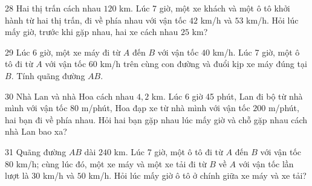 \gap
\begin{probbox}{28}{\relax}
Hai thị trấn cách nhau $120$ km. Lúc 7 giờ, một xe khách và một ô tô khởi hành từ hai thị trấn, đi về phía nhau với vận tốc $42$ km/h và $53$ km/h. Hỏi lúc mấy giờ, trước khi gặp nhau, hai xe cách nhau $25$ km?
\end{probbox}
\gap
\begin{probbox}{29}{\relax}
Lúc 6 giờ, một xe máy đi từ $A$ đến $B$ với vận tốc $40$ km/h. Lúc 7 giờ, một ô tô đi từ $A$ với vận tốc $60$ km/h trên cùng con đường và đuổi kịp xe máy đúng tại $B$. Tính quãng đường $AB$.
\end{probbox}
\gap
\begin{probbox}{30}{\relax}
Nhà Lan và nhà Hoa cách nhau $4{,}2$ km. Lúc 6 giờ 45 phút, Lan đi bộ từ nhà mình với vận tốc $80$ m/phút, Hoa đạp xe từ nhà mình với vận tốc $200$ m/phút, hai bạn đi về phía nhau. Hỏi hai bạn gặp nhau lúc mấy giờ và chỗ gặp nhau cách nhà Lan bao xa?
\end{probbox}
\begin{probbox}{31}{}
Quãng đường $AB$ dài $240$ km. Lúc 7 giờ, một ô tô đi từ $A$ đến $B$ với vận tốc $80$ km/h; cùng lúc đó, một xe máy và một xe tải đi từ $B$ về $A$ với vận tốc lần lượt là $30$ km/h và $50$ km/h. Hỏi lúc mấy giờ ô tô ở chính giữa xe máy và xe tải?
\end{probbox}
